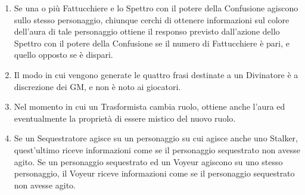\documentclass[a4paper,10pt]{article}
\begin{document}
\begin{enumerate}
 
 \item Se una o più Fattucchiere e lo Spettro con il potere della Confusione agiscono sullo stesso personaggio, chiunque cerchi di ottenere informazioni sul colore dell'aura di tale personaggio ottiene il responso previsto dall'azione dello Spettro con il potere della Confusione se il numero di Fattucchiere è pari, e quello opposto se è dispari.
 
%  
 
 \item Il modo in cui vengono generate le quattro frasi destinate a un Divinatore è a discrezione dei GM, e non è noto ai giocatori.
 
 \item Nel momento in cui un Trasformista cambia ruolo, ottiene anche l'aura ed eventualmente la proprietà di essere mistico del nuovo ruolo.
 
 \item Se un Sequestratore agisce su un personaggio su cui agisce anche uno Stalker, quest'ultimo riceve informazioni come se il personaggio sequestrato non avesse agito. Se un personaggio sequestrato ed un Voyeur agiscono su uno stesso personaggio, il Voyeur riceve informazioni come se il personaggio sequestrato non avesse agito.
 

\end{enumerate}
\end{document}
